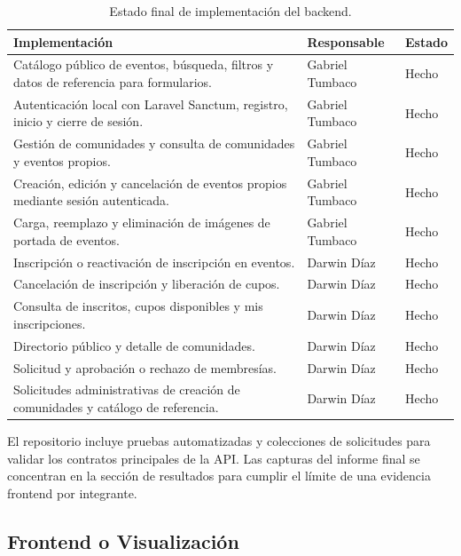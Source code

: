 \documentclass[12pt]{article}
\renewcommand{\arraystretch}{1.25}
\begin{document}
\begin{table}[htbp]
\centering
\footnotesize
\renewcommand{\arraystretch}{1.15}
\begin{tabularx}{\textwidth}{|Y|>{\centering\arraybackslash}p{2.8cm}|>{\centering\arraybackslash}p{1.8cm}|}
\hline
\textbf{Implementación} & \textbf{Responsable} & \textbf{Estado} \\
\hline
Catálogo público de eventos, búsqueda, filtros y datos de referencia para formularios. & Gabriel Tumbaco & Hecho \\
\hline
Autenticación local con Laravel Sanctum, registro, inicio y cierre de sesión. & Gabriel Tumbaco & Hecho \\
\hline
Gestión de comunidades y consulta de comunidades y eventos propios. & Gabriel Tumbaco & Hecho \\
\hline
Creación, edición y cancelación de eventos propios mediante sesión autenticada. & Gabriel Tumbaco & Hecho \\
\hline
Carga, reemplazo y eliminación de imágenes de portada de eventos. & Gabriel Tumbaco & Hecho \\
\hline
Inscripción o reactivación de inscripción en eventos. & Darwin Díaz & Hecho \\
\hline
Cancelación de inscripción y liberación de cupos. & Darwin Díaz & Hecho \\
\hline
Consulta de inscritos, cupos disponibles y mis inscripciones. & Darwin Díaz & Hecho \\
\hline
Directorio público y detalle de comunidades. & Darwin Díaz & Hecho \\
\hline
Solicitud y aprobación o rechazo de membresías. & Darwin Díaz & Hecho \\
\hline
Solicitudes administrativas de creación de comunidades y catálogo de referencia. & Darwin Díaz & Hecho \\
\hline
\end{tabularx}
\caption{Estado final de implementación del backend.}
\end{table}

El repositorio incluye pruebas automatizadas y colecciones de solicitudes para
validar los contratos principales de la API. Las capturas del informe final se
concentran en la sección de resultados para cumplir el límite de una evidencia
frontend por integrante.
\subsection{Frontend o Visualización}
\end{document}
